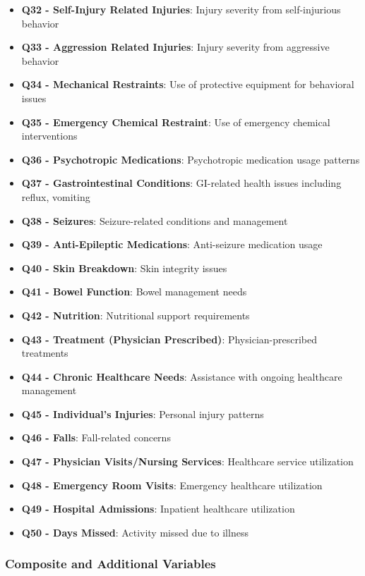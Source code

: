 \begin{itemize}
    \item \textbf{Q32 - Self-Injury Related Injuries}: Injury severity from self-injurious behavior
    \item \textbf{Q33 - Aggression Related Injuries}: Injury severity from aggressive behavior
    \item \textbf{Q34 - Mechanical Restraints}: Use of protective equipment for behavioral issues
    \item \textbf{Q35 - Emergency Chemical Restraint}: Use of emergency chemical interventions
    \item \textbf{Q36 - Psychotropic Medications}: Psychotropic medication usage patterns
    \item \textbf{Q37 - Gastrointestinal Conditions}: GI-related health issues including reflux, vomiting
    \item \textbf{Q38 - Seizures}: Seizure-related conditions and management
    \item \textbf{Q39 - Anti-Epileptic Medications}: Anti-seizure medication usage
    \item \textbf{Q40 - Skin Breakdown}: Skin integrity issues
    \item \textbf{Q41 - Bowel Function}: Bowel management needs
    \item \textbf{Q42 - Nutrition}: Nutritional support requirements
    \item \textbf{Q43 - Treatment (Physician Prescribed)}: Physician-prescribed treatments
    \item \textbf{Q44 - Chronic Healthcare Needs}: Assistance with ongoing healthcare management
    \item \textbf{Q45 - Individual's Injuries}: Personal injury patterns
    \item \textbf{Q46 - Falls}: Fall-related concerns
    \item \textbf{Q47 - Physician Visits/Nursing Services}: Healthcare service utilization
    \item \textbf{Q48 - Emergency Room Visits}: Emergency healthcare utilization
    \item \textbf{Q49 - Hospital Admissions}: Inpatient healthcare utilization
    \item \textbf{Q50 - Days Missed}: Activity missed due to illness
\end{itemize}

\subsubsection{Composite and Additional Variables}

